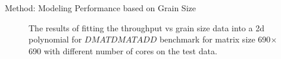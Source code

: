 \documentclass[10pt]{beamer}
\begin{document}
\begin{frame}{Method: Modeling Performance based on Grain Size}
\begin{outline}
\begin{figure}[H]
			
			\caption{The results of fitting the throughput vs grain size data into a 2d polynomial for $DMATDMATADD$ benchmark for matrix size 690$\times$690 with different number of cores on the test data.}
			\label{fig10}
		\end{figure}
	\end{outline}
\end{frame}

%			
\end{document}
